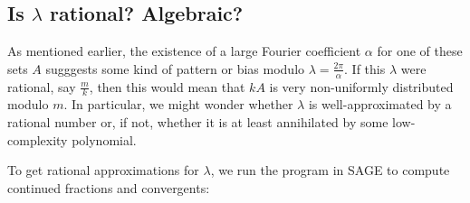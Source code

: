 \documentclass{report}
\theoremstyle{remark}
\numberwithin{equation}{section}
\begin{document}
\subsection{Is $\lambda$ rational?  Algebraic?}

As mentioned earlier, the existence of a large Fourier coefficient
$\alpha$ for one of these sets $A$ sugggests some kind of pattern or
bias modulo $\lambda = \frac{2\pi}{\alpha}$.  If this $\lambda$ were
rational, say $\frac{m}{k}$, then this would mean that $kA$ is very
non-uniformly distributed modulo $m$.  In particular, we might wonder
whether $\lambda$ is well-approximated by a rational number or, if
not, whether it is at least annihilated by some low-complexity
polynomial.  

To get rational approximations for $\lambda$, we run the program
 in SAGE to compute continued fractions and
convergents:
\end{document}
